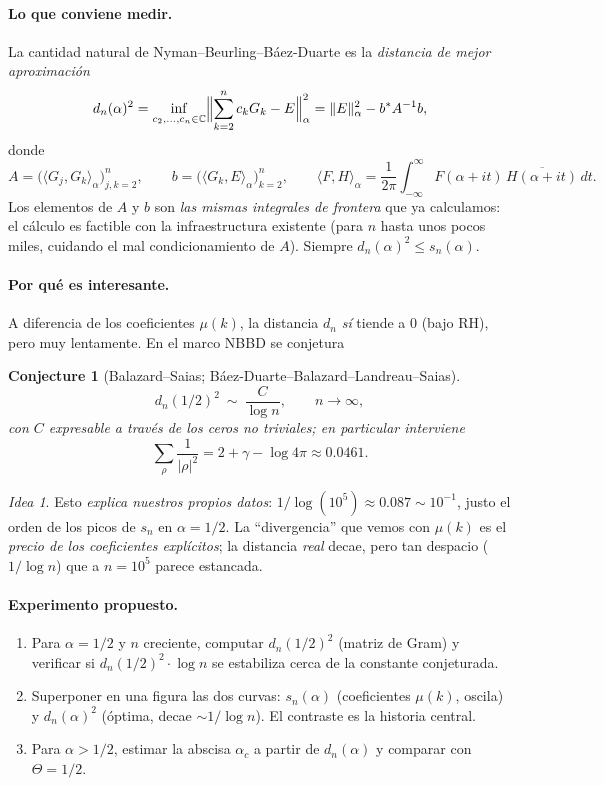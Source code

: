 \documentclass[11pt]{article}
\newcommand{\C}{\mathbb{C}}
\theoremstyle{plain}
\newtheorem{conjecture}{Conjecture}
\theoremstyle{definition}
\theoremstyle{remark}
\newtheorem*{idea}{Idea}
\begin{document}
\paragraph{Lo que conviene medir.} La cantidad natural de Nyman--Beurling--B\'aez-Duarte es la
\emph{distancia de mejor aproximaci\'on}
\[
d_n(\alpha)^2=\inf_{c_2,\dots,c_n\in\C}\Bigl\|\sum_{k=2}^n c_k G_k-E\Bigr\|_\alpha^2
=\|E\|_\alpha^2-b^{*}A^{-1}b,
\]
donde
\[
A=\bigl(\langle G_j,G_k\rangle_\alpha\bigr)_{j,k=2}^n,\qquad
b=\bigl(\langle G_k,E\rangle_\alpha\bigr)_{k=2}^n,\qquad
\langle F,H\rangle_\alpha=\frac1{2\pi}\int_{-\infty}^{\infty}F(\alpha+it)\,\overline{H(\alpha+it)}\,dt.
\]
Los elementos de $A$ y $b$ son \emph{las mismas integrales de frontera} que ya calculamos: el
c\'alculo es factible con la infraestructura existente (para $n$ hasta unos pocos miles, cuidando
el mal condicionamiento de $A$). Siempre $d_n(\alpha)^2\le s_n(\alpha)$.

\paragraph{Por qu\'e es interesante.} A diferencia de los coeficientes $\mu(k)$, la distancia
$d_n$ \emph{s\'i} tiende a $0$ (bajo RH), pero muy lentamente. En el marco NBBD se conjetura
\begin{conjecture}[Balazard--Saias; B\'aez-Duarte--Balazard--Landreau--Saias]
\[
d_n(1/2)^2\ \sim\ \frac{C}{\log n},\qquad n\to\infty,
\]
con $C$ expresable a trav\'es de los ceros no triviales; en particular interviene
\[
\sum_{\rho}\frac1{|\rho|^2}=2+\gamma-\log 4\pi\approx 0.0461.
\]
\end{conjecture}

\begin{idea}
Esto \emph{explica nuestros propios datos}: $1/\log(10^5)\approx0.087\sim10^{-1}$, justo el orden
de los picos de $s_n$ en $\alpha=1/2$. La ``divergencia'' que vemos con $\mu(k)$ es el
\emph{precio de los coeficientes expl\'icitos}; la distancia \emph{real} decae, pero tan despacio
($1/\log n$) que a $n=10^5$ parece estancada.
\end{idea}

\paragraph{Experimento propuesto.}
\begin{enumerate}[leftmargin=*]
  \item Para $\alpha=1/2$ y $n$ creciente, computar $d_n(1/2)^2$ (matriz de Gram) y verificar si
        $d_n(1/2)^2\cdot\log n$ se estabiliza cerca de la constante conjeturada.
  \item Superponer en una figura las dos curvas: $s_n(\alpha)$ (coeficientes $\mu(k)$, oscila) y
        $d_n(\alpha)^2$ (\'optima, decae $\sim1/\log n$). El contraste es la historia central.
  \item Para $\alpha>1/2$, estimar la abscisa $\alpha_c$ a partir de $d_n(\alpha)$ y comparar con
        $\Theta=1/2$.
\end{enumerate}
\end{document}
